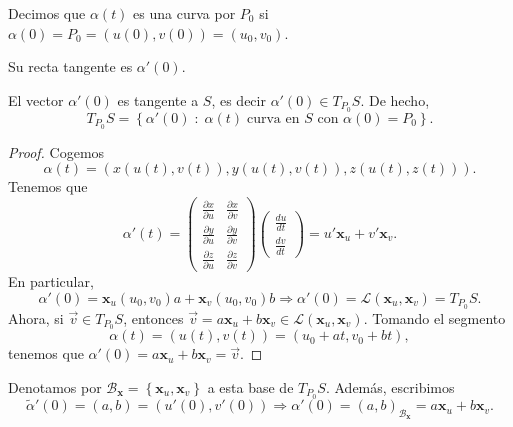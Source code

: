 \begin{notation}
Decimos que $\displaystyle \alpha\left(t\right) $ es una curva por $\displaystyle P_{0} $ si $\displaystyle \alpha\left(0\right)=P_{0}=\left(u\left(0\right), v\left(0\right) \right)=\left(u_{0}, v_{0}\right) $. 
\end{notation}
\begin{observation}
Su recta tangente es $\displaystyle \alpha'\left(0\right) $. 
\end{observation}
\begin{prop}
El vector $\displaystyle \alpha'\left(0\right) $ es tangente a $\displaystyle S $, es decir $\displaystyle \alpha'\left(0\right)\in T_{P_{0}}S $. De hecho, 
\[ T_{P_{0}}S = \left\{ \alpha'\left(0\right)\; : \; \alpha\left(t\right) \; \text{curva en $\displaystyle S $ con }\alpha\left(0\right)=P_{0}\right\}  .\]
\end{prop}
\begin{proof}
Cogemos 
\[\alpha\left(t\right)=\left(x\left(u\left(t\right), v\left(t\right)\right), y\left(u\left(t\right), v\left(t\right)\right), z\left(u\left(t\right), z\left(t\right)\right)\right) .\]
Tenemos que 
\[\alpha'\left(t\right)=\begin{pmatrix} \frac{\partial x}{\partial u} & \frac{\partial x}{\partial v} \\ \frac{\partial y}{\partial u} & \frac{\partial y}{\partial v} \\ \frac{\partial z}{\partial u} & \frac{\partial z}{\partial v}\end{pmatrix}\begin{pmatrix} \frac{du}{dt} \\ \frac{dv}{dt} \end{pmatrix}= u' \textbf{x} _{u} + v' \textbf{x} _{v} .\]
En particular, 
\[\alpha'\left(0\right)= \textbf{x} _{u}\left(u_{0}, v_{0}\right) a + \textbf{x} _{v}\left(u_{0}, v_{0}\right) b \Rightarrow \alpha'\left(0\right)=\mathcal{L}\left( \textbf{x} _{u}, \textbf{x} _{v}\right) = T_{P_{0}}S .\]
Ahora, si $\displaystyle \vec{v}\in T_{P_{0}}S $, entonces $\displaystyle \vec{v}= a \textbf{x} _{u} + b \textbf{x} _{v}\in \mathcal{L}\left( \textbf{x} _{u}, \textbf{x} _{v}\right) $. Tomando el segmento
\[\alpha\left(t\right)=\left(u\left(t\right), v\left(t\right)\right)=\left(u_{0} + at, v_{0} + bt\right),  \]
tenemos que $\displaystyle \alpha'\left(0\right)=a \textbf{x} _{u} + b \textbf{x} _{v} = \vec{v} $.
\end{proof}
\begin{notation}
	Denotamos por $\displaystyle \mathcal{B}_{ \textbf{x} }= \left\{ \textbf{x} _{u}, \textbf{x} _{v}\right\}  $ a esta base de $\displaystyle T_{P_{0}}S $. Además, escribimos
		\[ \tilde{\alpha}'\left(0\right)=\left(a,b\right)=\left(u'\left(0\right), v'\left(0\right)\right) \Rightarrow \alpha'\left(0\right)=\left(a,b\right)_{\mathcal{B}_{ \textbf{x} }}=a \textbf{x} _{u} + b \textbf{x} _{v} .\]
\end{notation}
